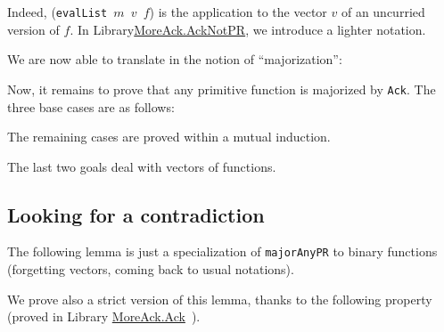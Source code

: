 

Indeed, (\texttt{evalList $m$ $v$ $f$}) is the application to the vector $v$ of
an uncurried version of $f$.
In Library\href{../theories/html/hydras.MoreAck.AckNotPR.html}{MoreAck.AckNotPR}, we introduce a lighter notation.






We are now able to translate in \gallina{} the notion of ``majorization'':





Now, it remains to prove that any primitive function is majorized by \texttt{Ack}.
The three base cases  are as follows:









The remaining cases are proved within a mutual  induction.









The last two goals deal with vectors of functions.




\subsection{Looking for a contradiction}

The following lemma is just a specialization of \texttt{majorAnyPR} to
binary functions (forgetting vectors, coming back to usual notations).



We prove also a strict version of this lemma, thanks to the following property (proved in Library
\href{../theories/html/hydras.MoreAck.Ack.html}{MoreAck.Ack}~).




